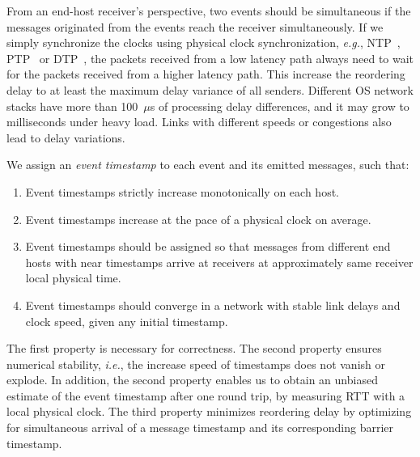 From an end-host receiver's perspective, two events should be simultaneous if the messages originated from the events reach the receiver simultaneously.
If we simply synchronize the clocks using physical clock synchronization, \textit{e.g.}, NTP~\cite{mills1991internet}, PTP~\cite{correll2005design} or DTP~\cite{lee2016globally}, the packets received from a low latency path always need to wait for the packets received from a higher latency path. This increase the reordering delay to at least the maximum delay variance of all senders.
Different OS network stacks have more than 100~$\mu$s of processing delay differences, and it may grow to milliseconds under heavy load.
Links with different speeds or congestions also lead to delay variations.

We assign an \textit{event timestamp} to each event and its emitted messages, such that:
\begin{enumerate}
\item Event timestamps strictly increase monotonically on each host.
\item Event timestamps increase at the pace of a physical clock on average.
\item Event timestamps should be assigned so that messages from different end hosts with near timestamps arrive at receivers at approximately same receiver local physical time.
\item Event timestamps should converge in a network with stable link delays and clock speed, given any initial timestamp.
\end{enumerate}

The first property is necessary for correctness. The second property ensures numerical stability, \textit{i.e.}, the increase speed of timestamps does not vanish or explode. In addition, the second property enables us to obtain an unbiased estimate of the event timestamp after one round trip, by measuring RTT with a local physical clock. The third property minimizes reordering delay by optimizing for simultaneous arrival of a message timestamp and its corresponding barrier timestamp.

